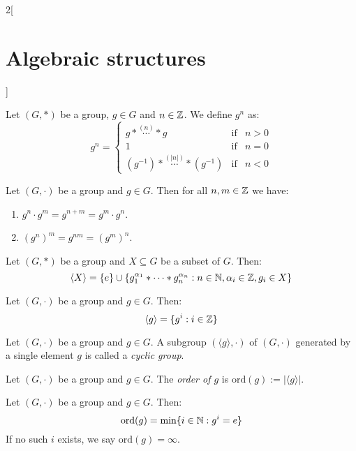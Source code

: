 \documentclass[../../../main.tex]{subfiles}
\begin{document}
\begin{multicols}{2}[\section{Algebraic structures}]
\begin{definition}
    \end{definition}
    \begin{definition}
        Let $(G,*)$ be a group, $g\in G$ and $n\in\mathbb{Z} $. We define $g^n$ as:
        $$g^n=\left\{
            \begin{array}{lll}
                g*\overset{(n)}{\cdots}* g                & \text{if} & n>0 \\
                1                                         & \text{if} & n=0 \\
                (g^{-1})*\overset{(|n|)}{\cdots}*(g^{-1}) & \text{if} & n<0
            \end{array}\right.$$
    \end{definition}
    \begin{lemma}
        Let $(G,\cdot)$ be a group and $g\in G$. Then for all $n,m\in\mathbb{Z} $ we have:
        \begin{enumerate}
            \item $g^n\cdot g^m=g^{n+m}=g^m\cdot g^n$.
            \item $(g^n)^m=g^{nm}=(g^m)^n$.
        \end{enumerate}
    \end{lemma}
    \begin{prop}
        Let $(G,*)$ be a group and $X\subseteq G$ be a subset of $G$. Then: $$\langle X\rangle=\{e\}\cup\{g_1^{\alpha_1}*\cdots* g_n^{\alpha_n}:n\in\mathbb{N} ,\alpha_i\in\mathbb{Z} ,g_i\in X\}$$
    \end{prop}
    \begin{corollary}
        Let $(G,\cdot)$ be a group and $g\in G$. Then: $$\langle g\rangle=\{g^i:i\in\mathbb{Z} \}$$
    \end{corollary}
    \begin{definition}
        Let $(G,\cdot)$ be a group and $g\in G$. A subgroup $(\langle g\rangle,\cdot)$ of $(G,\cdot)$ generated by a single element $g$ is called a \textit{cyclic group}.
    \end{definition}
    \begin{definition}
        Let $(G,\cdot)$ be a group and $g\in G$. The \textit{order of $g$} is $\text{ord}(g):=|\langle g\rangle|$.
    \end{definition}
    \begin{prop}
        Let $(G,\cdot)$ be a group and $g\in G$. Then: $$\text{ord}(g)=\min\{i\in\mathbb{N} :g^i=e\}$$
        If no such $i$ exists, we say $\text{ord}(g)=\infty$.
    \end{prop}
    \begin{corollary}

\end{corollary}
\end{multicols}
\end{document}
